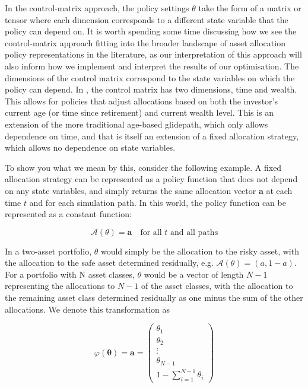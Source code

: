 \documentclass[11pt]{article}
\begin{document}
In the control-matrix approach, the policy settings \(\theta\) take the form of a matrix or tensor where each dimension corresponds to a different state variable that the policy can depend on. It is worth spending some time discussing how we see the control-matrix approach fitting into the broader landscape of asset allocation policy representations in the literature, as our interpretation of this approach will also inform how we implement and interpret the results of our optimisation. The dimensions of the control matrix correspond to the state variables on which the policy can depend. In \textcite{Makinen2024}, the control matrix has two dimensions, time and wealth. This allows for policies that adjust allocations based on both the investor's current age (or time since retirement) and current wealth level. This is an extension of the more traditional age-based glidepath, which only allows dependence on time, and that is itself an extension of a fixed allocation strategy, which allows no dependence on state variables.

To show you what we mean by this, consider the following example. A fixed allocation strategy can be represented as a policy function that does not depend on any state variables, and simply returns the same allocation vector \(\mathbf{a}\) at each time \(t\) and for each simulation path. In this world, the policy function can be represented as a constant function:

\begin{equation}\label{fixed_allocation_policy}
  \mathcal{A}(\theta) = \mathbf{a} \quad \text{for all } t \text{ and all paths}
\end{equation}

In a two-asset portfolio, \(\theta\) would simply be the allocation to the risky asset, with the allocation to the safe asset determined residually, e.g. \(\mathcal{A}(\theta) = (a, 1 - a)\). For a portfolio with N asset classes, \(\theta\) would be a vector of length \(N-1\) representing the allocations to \(N-1\) of the asset classes, with the allocation to the remaining asset class determined residually as one minus the sum of the other allocations. We denote this transformation as

\begin{equation}\label{phi_transformation}
  \varphi(\boldsymbol{\theta}) = \boldsymbol{a} = \begin{pmatrix} \theta_1 \\ \theta_2 \\ \vdots \\ \theta_{N-1} \\ 1 - \sum_{i=1}^{N-1} \theta_i \end{pmatrix}
\end{equation}
\end{document}
